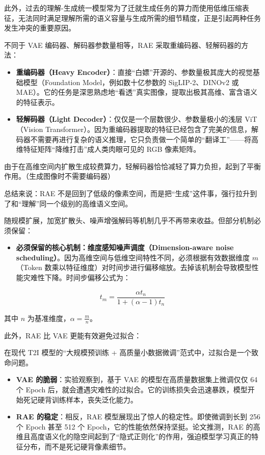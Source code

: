 此外，过去的理解-生成统一模型常为了迁就生成任务的算力而使用低维压缩表征，无法同时满足理解所需的语义容量与生成所需的细节精度，正是引起两种任务发生冲突的重要原因。

不同于 VAE 编码器、解码器参数量相等，RAE 采取重编码器、轻解码器的方法：

\begin{itemize}
\tightlist
\item
  \textbf{重编码器（Heavy Encoder）}：直接``白嫖''开源的、参数量极其庞大的视觉基础模型（Foundation Model，例如数十亿参数的 SigLIP-2、DINOv2 或 MAE）。它的任务是深思熟虑地``看透''真实图像，提取出极其高维、富含语义的特征表示。
\item
  \textbf{轻解码器（Light Decoder）}：仅仅是一个层数很少、参数量极小的浅层 ViT（Vision Transformer）。因为重编码器提取的特征已经包含了完美的信息，解码器不需要再进行复杂的语义推理，它只负责做一个简单的``翻译工''------将高维特征矩阵``降维打击''成人类肉眼可见的 RGB 像素矩阵。
\end{itemize}

由于在高维空间内扩散生成较费算力，轻解码器恰恰减轻了算力负担，起到了平衡作用。（生成图像时不需要编码器）

总结来说：RAE 不是回到了低级的像素空间，而是把``生成''这件事，强行拉升到了和``理解''同一个级别的高维语义空间。

随规模扩展，加宽扩散头、噪声增强解码等机制几乎不再带来收益。但部分机制必须保留：

\begin{itemize}
\tightlist
\item
  \textbf{必须保留的核心机制：维度感知噪声调度（Dimension-aware noise scheduling）}。因为高维空间与低维空间特性不同，必须根据有效数据维度 \(m\)（Token 数乘以特征维度）对时间步进行偏移缩放。去掉该机制会导致模型性能灾难性下降。时间步偏移公式为：
\end{itemize}

\[
t_m=\frac{\alpha t_n}{1+(\alpha-1)t_n}
\]

其中 \(n\) 为基准维度，\(\alpha=\frac{m}{n}\)。

此外，RAE 比 VAE 更能有效避免过拟合：

在现代 T2I 模型的``大规模预训练 + 高质量小数据微调''范式中，过拟合是一个致命问题。

\begin{itemize}
\tightlist
\item
  \textbf{VAE 的脆弱}：实验观察到，基于 VAE 的模型在高质量数据集上微调仅仅 64 个 Epoch 后，就会遭遇灾难性的过拟合。它的训练损失会迅速暴跌，模型开始死记硬背训练样本，丧失泛化能力。
\item
  \textbf{RAE 的稳定}：相反，RAE 模型展现出了惊人的稳定性。即使微调到长到 256 个 Epoch 甚至 512 个 Epoch，它的性能依然保持坚挺。论文推测，RAE 的高维且高度语义化的隐空间起到了``隐式正则化''的作用，强迫模型学习真正的特征分布，而不是死记硬背像素细节。
\end{itemize}

